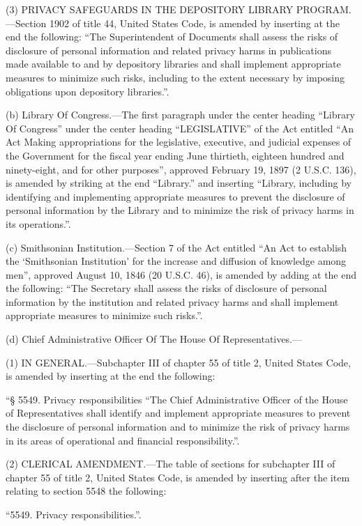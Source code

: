 (3) PRIVACY SAFEGUARDS IN THE DEPOSITORY LIBRARY PROGRAM.—Section 1902 of title 44, United States Code, is amended by inserting at the end the following: “The Superintendent of Documents shall assess the risks of disclosure of personal information and related privacy harms in publications made available to and by depository libraries and shall implement appropriate measures to minimize such risks, including to the extent necessary by imposing obligations upon depository libraries.”.

(b) Library Of Congress.—The first paragraph under the center heading “Library Of Congress” under the center heading “LEGISLATIVE” of the Act entitled “An Act Making appropriations for the legislative, executive, and judicial expenses of the Government for the fiscal year ending June thirtieth, eighteen hundred and ninety-eight, and for other purposes”, approved February 19, 1897 (2 U.S.C. 136), is amended by striking at the end “Library.” and inserting “Library, including by identifying and implementing appropriate measures to prevent the disclosure of personal information by the Library and to minimize the risk of privacy harms in its operations.”.

(c) Smithsonian Institution.—Section 7 of the Act entitled “An Act to establish the ‘Smithsonian Institution’ for the increase and diffusion of knowledge among men”, approved August 10, 1846 (20 U.S.C. 46), is amended by adding at the end the following: “The Secretary shall assess the risks of disclosure of personal information by the institution and related privacy harms and shall implement appropriate measures to minimize such risks.”.

(d) Chief Administrative Officer Of The House Of Representatives.—

(1) IN GENERAL.—Subchapter III of chapter 55 of title 2, United States Code, is amended by inserting at the end the following:


“§ 5549. Privacy responsibilities
“The Chief Administrative Officer of the House of Representatives shall identify and implement appropriate measures to prevent the disclosure of personal information and to minimize the risk of privacy harms in its areas of operational and financial responsibility.”.

(2) CLERICAL AMENDMENT.—The table of sections for subchapter III of chapter 55 of title 2, United States Code, is amended by inserting after the item relating to section 5548 the following:


“5549. Privacy responsibilities.”.

